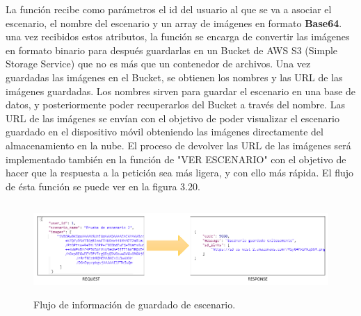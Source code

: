 La función recibe como parámetros el id del usuario al que se va a asociar el escenario, el nombre del escenario y un array de imágenes en formato \textbf{Base64}. una vez recibidos estos atributos, la función se encarga de convertir las imágenes en formato binario para después guardarlas en un Bucket de AWS S3 (Simple Storage Service) que no es más que un contenedor de archivos. Una vez guardadas las imágenes en el Bucket, se obtienen los nombres y las URL de las imágenes guardadas. Los nombres sirven para guardar el escenario en una base de datos, y posteriormente poder recuperarlos del Bucket a través del nombre. Las URL de las imágenes se envían con el objetivo de poder visualizar el escenario guardado en el dispositivo móvil obteniendo las imágenes directamente del almacenamiento en la nube. El proceso de devolver las URL de las imágenes será implementado también en la función de "VER ESCENARIO" con el objetivo de hacer que la respuesta a la petición sea más ligera, y con ello más rápida. El flujo de ésta función se puede ver en la figura 3.20.

\begin{figure}[h!]
	\centering
	\includegraphics[width=15cm,height=3.5cm]{imagenes/desarrollo/arquitectura/STORESC_SUCCESS.png}
	\caption{Flujo de información de guardado de escenario.}
	\label{fig:regsuccess}
\end{figure}